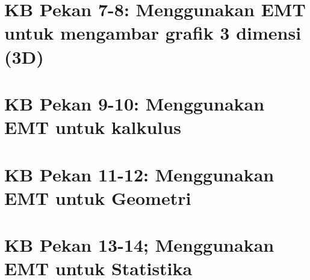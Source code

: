 \documentclass{report}
\begin{document}
\newpage
\chapter{KB Pekan 7-8: Menggunakan EMT untuk mengambar grafik 3 dimensi (3D)}


\newpage
\chapter{KB Pekan 9-10: Menggunakan EMT untuk kalkulus}


\newpage
\chapter{KB Pekan 11-12: Menggunakan EMT untuk Geometri}


\newpage
\chapter{KB Pekan 13-14; Menggunakan EMT untuk Statistika}

\end{document}
